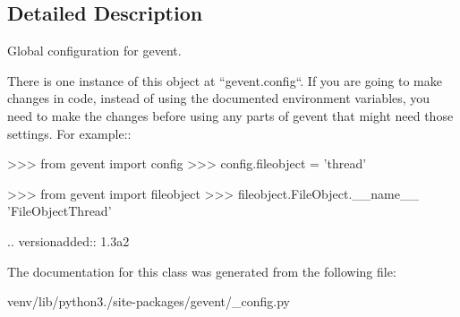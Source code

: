 \subsection{Detailed Description}
\begin{DoxyVerb}Global configuration for gevent.

There is one instance of this object at ``gevent.config``. If you
are going to make changes in code, instead of using the documented
environment variables, you need to make the changes before using
any parts of gevent that might need those settings. For example::

    >>> from gevent import config
    >>> config.fileobject = 'thread'

    >>> from gevent import fileobject
    >>> fileobject.FileObject.__name__
    'FileObjectThread'

.. versionadded:: 1.3a2\end{DoxyVerb}
 

The documentation for this class was generated from the following file\+:\begin{DoxyCompactItemize}
\item 
venv/lib/python3./site-\/packages/gevent/\+\_\+config.\+py\end{DoxyCompactItemize}
